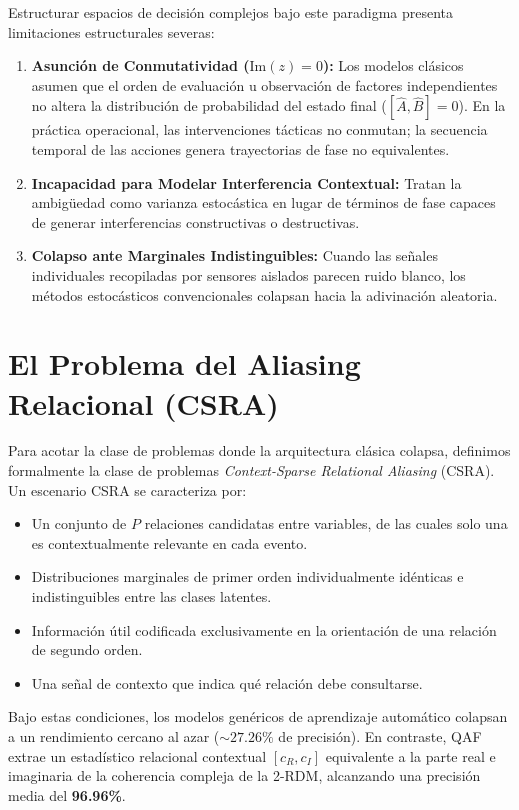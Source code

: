 \documentclass[11pt,a4paper,oneside]{report}
\begin{document}
Estructurar espacios de decisión complejos bajo este paradigma presenta limitaciones estructurales severas:
\begin{enumerate}
    \item \textbf{Asunción de Conmutatividad ($\text{Im}(z) = 0$):} Los modelos clásicos asumen que el orden de evaluación u observación de factores independientes no altera la distribución de probabilidad del estado final ($[\hat{A}, \hat{B}] = 0$). En la práctica operacional, las intervenciones tácticas no conmutan; la secuencia temporal de las acciones genera trayectorias de fase no equivalentes.
    \item \textbf{Incapacidad para Modelar Interferencia Contextual:} Tratan la ambigüedad como varianza estocástica en lugar de términos de fase capaces de generar interferencias constructivas o destructivas.
    \item \textbf{Colapso ante Marginales Indistinguibles:} Cuando las señales individuales recopiladas por sensores aislados parecen ruido blanco, los métodos estocásticos convencionales colapsan hacia la adivinación aleatoria.
\end{enumerate}

\section{El Problema del Aliasing Relacional (CSRA)}
Para acotar la clase de problemas donde la arquitectura clásica colapsa, definimos formalmente la clase de problemas \emph{Context-Sparse Relational Aliasing} (CSRA). Un escenario CSRA se caracteriza por:
\begin{itemize}
    \item Un conjunto de $P$ relaciones candidatas entre variables, de las cuales solo una es contextualmente relevante en cada evento.
    \item Distribuciones marginales de primer orden individualmente idénticas e indistinguibles entre las clases latentes.
    \item Información útil codificada exclusivamente en la orientación de una relación de segundo orden.
    \item Una señal de contexto que indica qué relación debe consultarse.
\end{itemize}

Bajo estas condiciones, los modelos genéricos de aprendizaje automático colapsan a un rendimiento cercano al azar ($\sim 27.26\%$ de precisión). En contraste, QAF extrae un estadístico relacional contextual $[c_R, c_I]$ equivalente a la parte real e imaginaria de la coherencia compleja de la 2-RDM, alcanzando una precisión media del \textbf{96.96\%}.
\end{document}
